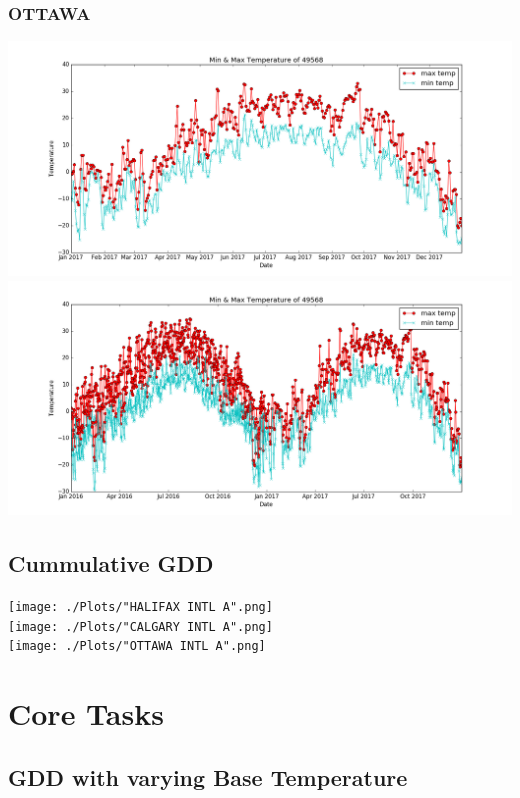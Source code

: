 \documentclass{article}
\begin{document}
\subsubsection{OTTAWA}

\includegraphics[scale=0.35]{./Plots/49568-2017_minmax.png}\\

\includegraphics[scale=0.35]{./Plots/49568-2016_minmax.png}\\

\subsection{Cummulative GDD}

\texttt{[image: ./Plots/"HALIFAX INTL A".png]}\\

\texttt{[image: ./Plots/"CALGARY INTL A".png]}\\

\texttt{[image: ./Plots/"OTTAWA INTL A".png]}\\

\section{ \bf Core Tasks}
\subsection{GDD with varying Base Temperature}
\end{document}

